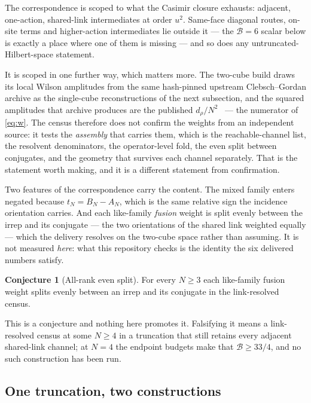 \documentclass[11pt]{article}
\theoremstyle{plain}
\theoremstyle{definition}
\newtheorem{conjecture}[theorem]{Conjecture}
\theoremstyle{remark}
\begin{document}
The correspondence is scoped to what the Casimir closure exhausts: adjacent,
one-action, shared-link intermediates at order $u^2$. Same-face diagonal
routes, on-site terms and higher-action intermediates lie outside it --- the
$\mathcal B=6$ scalar below is exactly a place where one of them is missing --- and so
does any untruncated-Hilbert-space statement.

It is scoped in one further way, which matters more. The two-cube build draws
its local Wilson amplitudes from the same hash-pinned upstream
Clebsch--Gordan archive as the single-cube reconstructions of the next
subsection, and the squared amplitudes that archive produces are the published
$d_\rho/N^2$~\cite{CBB2025} --- the numerator of \eqref{eq:w}. The census
therefore does not confirm the weights from an independent source: it tests the
\emph{assembly} that carries them, which is the reachable-channel list, the
resolvent denominators, the operator-level fold, the even split between
conjugates, and the geometry that survives each channel separately. That is the
statement worth making, and it is a different statement from confirmation.

Two features of the correspondence carry the content. The mixed family enters
negated because $t_N=B_N-A_N$, which is the same relative sign the incidence
orientation carries. And each like-family \emph{fusion} weight is split evenly
between the irrep and its conjugate --- the two orientations of the shared link
weighted equally --- which the delivery resolves on the two-cube space rather
than assuming. It is not measured \emph{here}: what this repository checks is
the identity the six delivered numbers satisfy.

\begin{conjecture}[All-rank even split]\label{conj:split}
For every $N\ge3$ each like-family fusion weight splits evenly between an
irrep and its conjugate in the link-resolved census.
\end{conjecture}

\noindent This is a conjecture and nothing here promotes it. Falsifying it
means a link-resolved census at some $N\ge4$ in a truncation that still
retains every adjacent shared-link channel; at $N=4$ the endpoint budgets make
that $\mathcal B\ge33/4$, and no such construction has been run.

\subsection{One truncation, two constructions}
\end{document}
